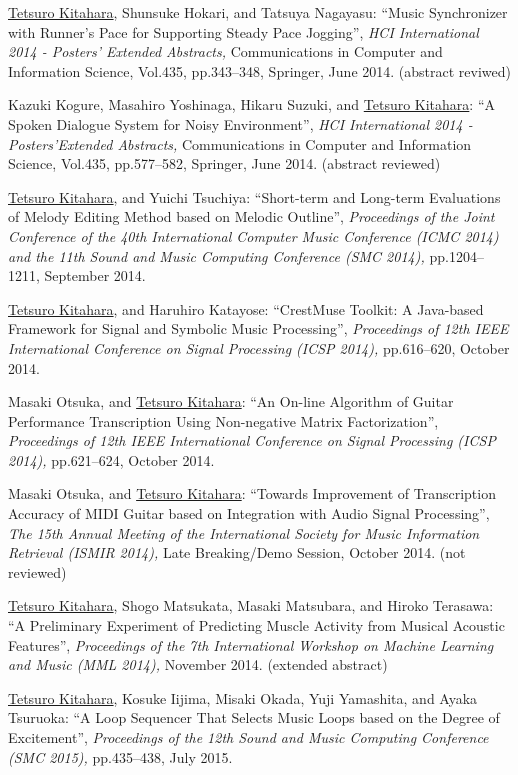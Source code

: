 \begin{Enumerate}
\item 
\underline{Tetsuro Kitahara}, 
Shunsuke Hokari, 
and 
Tatsuya Nagayasu: 
    ``Music Synchronizer with Runner's Pace
for Supporting Steady Pace Jogging'', 
    {\it HCI International 2014 - Posters’ Extended Abstracts,
    } Communications in Computer and Information Science, Vol.435, pp.343--348, Springer, June 2014. 
(abstract reviwed)
\item 
Kazuki Kogure, 
Masahiro Yoshinaga, 
Hikaru Suzuki, 
and 
\underline{Tetsuro Kitahara}: 
    ``A Spoken Dialogue System
for Noisy Environment'', 
    {\it HCI International 2014 - Posters’Extended Abstracts,
    } Communications in Computer and Information Science, Vol.435, pp.577--582, Springer, June 2014. 
(abstract reviewed)
\item 
\underline{Tetsuro Kitahara}, 
and 
Yuichi Tsuchiya: 
    ``Short-term and Long-term Evaluations of Melody Editing Method based on Melodic Outline'', 
    {\it Proceedings of the Joint Conference of the 40th International Computer Music Conference (ICMC 2014) and the 11th Sound and Music Computing Conference (SMC 2014),
    } pp.1204--1211, September 2014. 

\item 
\underline{Tetsuro Kitahara}, 
and 
Haruhiro Katayose: 
    ``CrestMuse Toolkit: A Java-based Framework for Signal and Symbolic Music Processing'', 
    {\it Proceedings of 12th IEEE International Conference on Signal Processing (ICSP 2014),
    } pp.616--620, October 2014. 

\item 
Masaki Otsuka, 
and 
\underline{Tetsuro Kitahara}: 
    ``An On-line Algorithm of Guitar Performance Transcription Using Non-negative Matrix Factorization'', 
    {\it Proceedings of 12th IEEE International Conference on Signal Processing (ICSP 2014),
    } pp.621--624, October 2014. 

\item 
Masaki Otsuka, 
and 
\underline{Tetsuro Kitahara}: 
    ``Towards Improvement of Transcription Accuracy of MIDI Guitar based on Integration with Audio Signal Processing'', 
    {\it The 15th Annual Meeting of the International Society for Music Information Retrieval (ISMIR 2014),
    } Late Breaking/Demo Session, October 2014. 
(not reviewed)
\item 
\underline{Tetsuro Kitahara}, 
Shogo Matsukata, 
Masaki Matsubara, 
and 
Hiroko Terasawa: 
    ``A Preliminary Experiment of Predicting Muscle Activity from Musical Acoustic Features'', 
    {\it Proceedings of the 7th International Workshop on Machine Learning and Music (MML 2014),
    } November 2014. 
(extended abstract)
\item 
\underline{Tetsuro Kitahara}, 
Kosuke Iijima, 
Misaki Okada, 
Yuji Yamashita, 
and 
Ayaka Tsuruoka: 
    ``A Loop Sequencer That Selects Music Loops based on the Degree of Excitement'', 
    {\it Proceedings of the 12th Sound and Music Computing Conference (SMC 2015),
    } pp.435--438, July 2015. 


\end{Enumerate}
